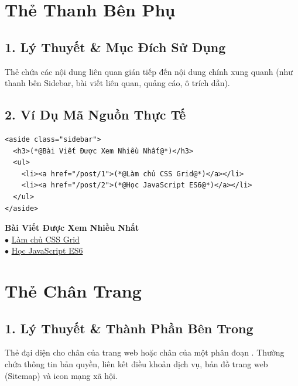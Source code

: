 \section{Thẻ Thanh Bên Phụ }
\subsection{1. Lý Thuyết \& Mục Đích Sử Dụng}
Thẻ  chứa các nội dung liên quan gián tiếp đến nội dung chính xung quanh (như thanh bên Sidebar, bài viết liên quan, quảng cáo, ô trích dẫn).

\subsection{2. Ví Dụ Mã Nguồn Thực Tế}
\begin{codeWindow}
\begin{lstlisting}[language=HTML5]
<aside class="sidebar">
  <h3>(*@Bài Viết Được Xem Nhiều Nhất@*)</h3>
  <ul>
    <li><a href="/post/1">(*@Làm chủ CSS Grid@*)</a></li>
    <li><a href="/post/2">(*@Học JavaScript ES6@*)</a></li>
  </ul>
</aside>
\end{lstlisting}
\end{codeWindow}

\begin{browserWindow}
\sffamily\small
\begin{tcolorbox}[colback=secondaryTeal!5, colframe=secondaryTeal!30, width=0.75\linewidth, arc=5pt]
{\bfseries\color{secondaryTeal} Bài Viết Được Xem Nhiều Nhất}\\[4pt]
$\bullet$ \textcolor{primaryBlue}{\underline{Làm chủ CSS Grid}}\\[2pt]
$\bullet$ \textcolor{primaryBlue}{\underline{Học JavaScript ES6}}
\end{tcolorbox}
\end{browserWindow}

\section{Thẻ Chân Trang }
\subsection{1. Lý Thuyết \& Thành Phần Bên Trong}
Thẻ  đại diện cho chân của trang web hoặc chân của một phân đoạn . Thường chứa thông tin bản quyền, liên kết điều khoản dịch vụ, bản đồ trang web (Sitemap) và icon mạng xã hội.

